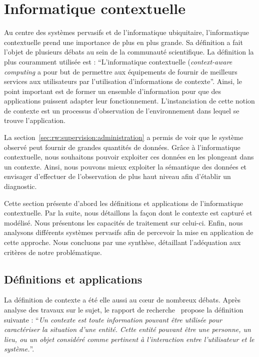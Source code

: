\section{Informatique contextuelle}\label{sec:rw:supervision:contexte}
Au centre des systèmes pervasifs et de l'informatique ubiquitaire, l'informatique contextuelle prend une importance de plus en plus grande. Sa définition a fait l'objet de plusieurs débats au sein de la communauté scientifique. La définition la plus couramment utilisée est : \enquote{L'informatique contextuelle (\textit{context-aware computing} a pour but de permettre aux équipements de fournir de meilleurs services aux utilisateurs par l'utilisation d'informations de contexte}\cite{Han:contextaware}. Ainsi, le point important est de former un ensemble d'information pour que des applications puissent adapter leur fonctionnement. L'instanciation de cette notion de contexte est un processus d'observation de l'environnement dans lequel se trouve l'application.

La section~\ref{sec:rw:supervision:administration} a permis de voir que le système observé peut fournir de grandes quantités de données. Grâce à l'informatique contextuelle, nous souhaitons pouvoir exploiter ces données en les plongeant dans un contexte. Ainsi, nous pouvons mieux exploiter la sémantique des données et envisager d’effectuer de l'observation de plus haut niveau afin d'établir un diagnostic.

Cette section présente d'abord les définitions et applications de l'informatique contextuelle. Par la suite, nous détaillons la façon dont le contexte est capturé et modélisé. Nous présentons les capacités de traitement sur celui-ci. Enfin, nous analysons différents systèmes pervasifs afin de percevoir la mise en application de cette approche. Nous concluons par une synthèse, détaillant l'adéquation aux critères de notre problématique.

\subsection{Définitions et applications}
La définition de contexte a été elle aussi au cœur de nombreux débats. Après analyse des travaux sur le sujet, le rapport de recherche~\cite{Dey:context} propose la définition suivante : \enquote{\it Un contexte est toute information pouvant être utilisée pour caractériser la situation d'une entité. Cette entité pouvant être une personne, un lieu, ou un objet considéré comme pertinent à l'interaction entre l'utilisateur et le système.}.

